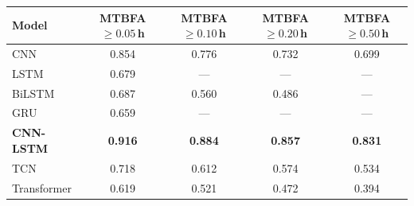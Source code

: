 \begin{tabular}{lcccc}
\toprule
\textbf{Model} & \textbf{MTBFA} $\boldsymbol{\geq 0.05}$\,\textbf{h} & \textbf{MTBFA} $\boldsymbol{\geq 0.10}$\,\textbf{h} & \textbf{MTBFA} $\boldsymbol{\geq 0.20}$\,\textbf{h} & \textbf{MTBFA} $\boldsymbol{\geq 0.50}$\,\textbf{h} \\
\midrule
CNN         & 0.854 & 0.776 & 0.732 & 0.699 \\
LSTM        & 0.679 & ---   & ---   & ---   \\
BiLSTM      & 0.687 & 0.560 & 0.486 & ---   \\
GRU         & 0.659 & ---   & ---   & ---   \\
\textbf{CNN-LSTM} & \textbf{0.916} & \textbf{0.884} & \textbf{0.857} & \textbf{0.831} \\
TCN         & 0.718 & 0.612 & 0.574 & 0.534 \\
Transformer & 0.619 & 0.521 & 0.472 & 0.394 \\
\bottomrule
\end{tabular}

